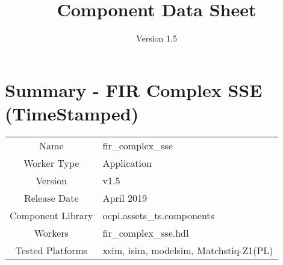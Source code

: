 \iffalse
This file is protected by Copyright. Please refer to the COPYRIGHT file
distributed with this source distribution.

This file is part of OpenCPI <http://www.opencpi.org>

OpenCPI is free software: you can redistribute it and/or modify it under the
terms of the GNU Lesser General Public License as published by the Free Software
Foundation, either version 3 of the License, or (at your option) any later
version.

OpenCPI is distributed in the hope that it will be useful, but WITHOUT ANY
WARRANTY; without even the implied warranty of MERCHANTABILITY or FITNESS FOR A
PARTICULAR PURPOSE. See the GNU Lesser General Public License for more details.

You should have received a copy of the GNU Lesser General Public License along
with this program. If not, see <http://www.gnu.org/licenses/>.
\fi

\def\importpath{../../../imports/ocpi.assets/components/dsp_comps/fir_complex_sse.test/doc/}

\def\docTitle{Component Data Sheet}
\def\docVersion{1.5}
\date{Version \docVersion} %
\title{\docTitle}
\lhead{\small{\docTitle}}

\def\comp{fir\_complex\_sse}
\edef\ecomp{fir_complex_sse}
\def\Comp{FIR Complex SSE (TimeStamped)}
\graphicspath{ {figures/} }



\section*{Summary - \Comp}



\begin{tabular}{|c|M{13.5cm}|}
	\hline
	                  &                                                              \\
	\hline
	Name              & \comp                                                        \\
	\hline
	Worker Type       & Application                                                  \\
	\hline
	Version           & v\docVersion \\
	\hline
	Release Date      & April 2019 \\
	\hline
	Component Library & ocpi.assets\_ts.components                                        \\
	\hline
	Workers           & \comp.hdl                                                    \\
	\hline
	Tested Platforms  & xsim, isim, modelsim, Matchstiq-Z1(PL) \\
	\hline
\end{tabular}

